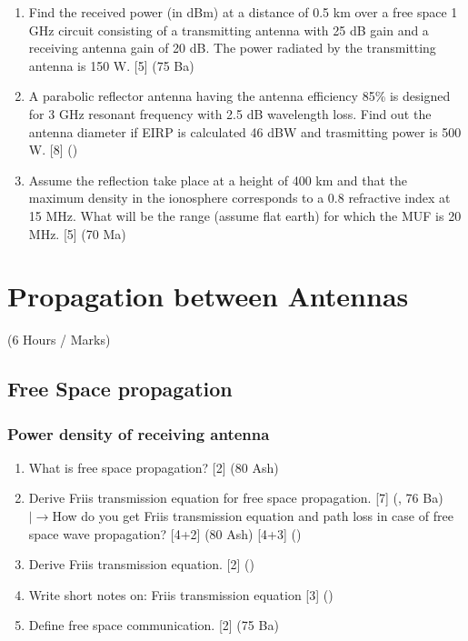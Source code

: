 \documentclass[12pt]{article}
\newcommand{\lb}{\\$\left|\rightarrow\right.$}
\begin{document}
\begin{enumerate}
      \item Find the received power (in dBm) at a distance of 0.5 km over a free space 1 GHz circuit consisting of a transmitting antenna with 25 dB gain and a receiving antenna gain of 20 dB. The power radiated by the transmitting antenna is 150 W. \hfill [5] (75 Ba)

      \item A parabolic reflector antenna having the antenna efficiency 85\% is designed for 3 GHz resonant frequency with 2.5 dB wavelength loss. Find out the antenna diameter if EIRP is calculated 46 dBW and trasmitting power is 500 W. \hfill [8] ()

      \item Assume the reflection take place at a height of 400 km and that the maximum density in the ionosphere corresponds to a 0.8 refractive index at 15 MHz. What will be the range (assume flat earth) for which the MUF is 20 MHz. \hfill [5] (70 Ma)
    \end{enumerate}

\pagebreak

\section{Propagation between Antennas}
  \begin{center} (6 Hours / Marks) \end{center}

  \subsection{Free Space propagation}
    \subsubsection{Power density of receiving antenna}
      \begin{enumerate}
        \item What is free space propagation? \hfill [2] (80 Ash)

        \item Derive Friis transmission equation for free space propagation. \hfill [7] (, 76 Ba)
          \lb How do you get Friis transmission equation and path loss in case of free space wave propagation? \hfill [4+2] (80 Ash) [4+3] ()

        \item Derive Friis transmission equation. \hfill [2] ()

        \item Write short notes on: Friis transmission equation \hfill [3] ()

        \item Define free space communication. \hfill [2] (75 Ba)
      \end{enumerate}
\end{document}
